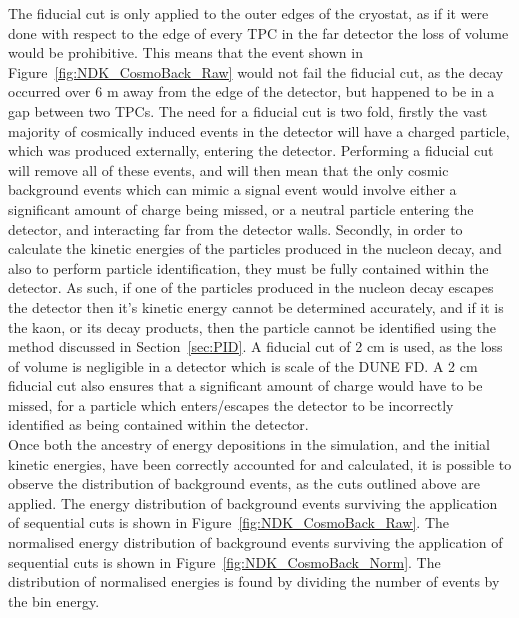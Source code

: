 The fiducial cut is only applied to the outer edges of the cryostat, as if it were done with respect to the edge of every TPC in the far detector the loss of volume would be prohibitive. This means that the event shown in Figure~\ref{fig:NDK_CosmoBack_Raw} would not fail the fiducial cut, as the decay occurred over 6 m away from the edge of the detector, but happened to be in a gap between two TPCs. The need for a fiducial cut is two fold, firstly the vast majority of cosmically induced events in the detector will have a charged particle, which was produced externally, entering the detector. Performing a fiducial cut will remove all of these events, and will then mean that the only cosmic background events which can mimic a signal event would involve either a significant amount of charge being missed, or a neutral particle entering the detector, and interacting far from the detector walls. Secondly, in order to calculate the kinetic energies of the particles produced in the nucleon decay, and also to perform particle identification, they must be fully contained within the detector. As such, if one of the particles produced in the nucleon decay escapes the detector then it's kinetic energy cannot be determined accurately, and if it is the kaon, or its decay products, then the particle cannot be identified using the method discussed in Section~\ref{sec:PID}. A fiducial cut of 2 cm is used, as the loss of volume is negligible in a detector which is scale of the DUNE FD. A 2 cm fiducial cut also ensures that a significant amount of charge would have to be missed, for a particle which enters/escapes the detector to be incorrectly identified as being contained within the detector. \\

Once both the ancestry of energy depositions in the simulation, and the initial kinetic energies, have been correctly accounted for and calculated, it is possible to observe the distribution of background events, as the cuts outlined above are applied. The energy distribution of background events surviving the application of sequential cuts is shown in Figure~\ref{fig:NDK_CosmoBack_Raw}. The normalised energy distribution of background events surviving the application of sequential cuts is shown in Figure~\ref{fig:NDK_CosmoBack_Norm}. The distribution of normalised energies is found by dividing the number of events by the bin energy. \\

